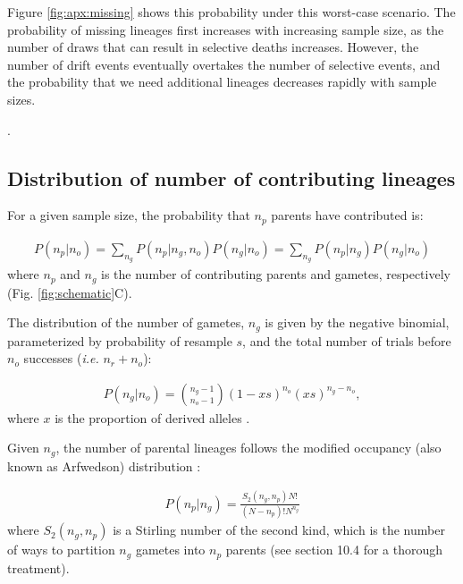 \documentclass[review]{elsarticle}
\newcommand{\sgcomment}[1]{{\color{red}{SG: #1}}}
\newcommand{\ikcomment}[1]{{\color{blue}{IK: #1}}}
\begin{document}
Figure \ref{fig:apx:missing} \sgcomment{Has figure 4 been mentioned yet?} shows this probability under this worst-case scenario.
The probability of missing lineages first increases with increasing sample size, as 
the number of draws that can result in selective deaths increases. 
However, the number of drift events eventually overtakes the number of selective events, 
and the probability that we need additional lineages decreases rapidly with
sample sizes.

\ikcomment{This figure needs to be updated}.


\subsection{Distribution of number of contributing lineages}
\label{subsec:distribution}

For a given sample size, the probability that $n_p$ parents have contributed is:

\begin{align}
  \label{eq:conditional}
  P(n_p | n_o) = \sum_{n_g} P(n_p | n_g,n_o)P(n_g | n_o) = \sum_{n_g} P(n_p | n_g)P(n_g | n_o) 
\end{align}
where $n_p$ and $n_g$ is the number of contributing parents and gametes, respectively (Fig.
\ref{fig:schematic}C). 

The distribution of the number of gametes, $n_g$ is given by the negative binomial, parameterized by
probability of resample $s$, and the total number of trials before $n_o$ successes (\textit{i.e.}
$n_r+n_o$): \sgcomment{ The parameter is the number of successes -- the number of trials is the random variable:
The distribution of the number of gametes, $n_g\geq n_o$ is given by the negative binomial, parameterized by
probability of success $1-s$, and the total number of required successes $n_o$ successes:}



\begin{align}
  \label{eq:neg-binomial-trials}
  P(n_g|n_o) = \binom{n_g-1}{n_o-1}(1-xs)^{n_o}(xs)^{n_g-n_o},
\end{align}
where $x$ is the proportion of derived alleles \sgcomment{is this in the parental population or the sample? It would be true for both I think!}. 


Given $n_g$, the number of parental lineages follows the modified occupancy (also known as Arfwedson) distribution \citep{Wakeley2009,ONeill2019,JohnsonEtAl2005}:

\begin{align}
  \label{eq:occupancy}
  P(n_p|n_g) = \frac{S_2(n_g,n_p) N!}{(N-n_p)! N^{n_g}}
\end{align}
where $S_2(n_g,n_p)$ is a Stirling number of the second kind, which is the number of ways to
partition $n_g$ gametes into $n_p$ parents (see \cite{JohnsonEtAl2005} section 10.4 for a thorough
treatment). %
\end{document}
